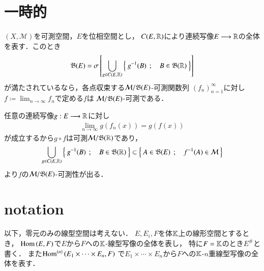 \section{一時的}
	\begin{screen}
		\begin{thm}[可測関数列の各点極限の可測性]
			$(X,\mathcal{M})$を可測空間，$E$を位相空間とし，
			$C(E,\R)$により連続写像$E \longrightarrow \R$の全体を表す．このとき
			\begin{align}
				\borel{E} = \sgmalg{\bigcup_{g \in C(E,\R)} \Set{g^{-1}(B)}{B \in \borel{\R}}}
			\end{align}
			が満たされているなら，各点収束する$\mathcal{M}/\borel{E}$-可測関数列
			$(f_n)_{n=1}^{\infty}$に対し
			$f \coloneqq \lim_{n \to \infty} f_n$で定める$f$は
			$\mathcal{M}/\borel{E}$-可測である．
		\end{thm}
	\end{screen}
	\begin{prf}
		任意の連続写像$g:E \longrightarrow \R$に対し
		\begin{align}
			\lim_{n \to \infty} g \left( f_n (x) \right)
			= g \left( f (x) \right)
		\end{align}
		が成立するから$g \circ f$は可測$\mathcal{M}/\borel{\R}$であり，
		\begin{align}
			\bigcup_{g \in C(E,\R)} \Set{g^{-1}(B)}{B \in \borel{\R}}
			\subset \Set{A \in \borel{E}}{f^{-1}(A) \in \mathcal{M}}
		\end{align}
		より$f$の$\mathcal{M}/\borel{E}$-可測性が出る．
	\end{prf}

\section{notation}
	以下，零元のみの線型空間は考えない．
	$E,E_i,F$を体$\K$上の線形空間とするとき，
	$\Hom{E}{F}$で$E$から$F$への$\K$-線型写像の全体を表し，
	特に$F = \K$のとき$E^\#$と書く．
	また$\Ln{E_1 \times \cdots \times E_n}{F}{n}$
	で$E_1 \times \cdots \times E_n$から$F$への$\K$-$n$重線型写像の全体を表す．
	
